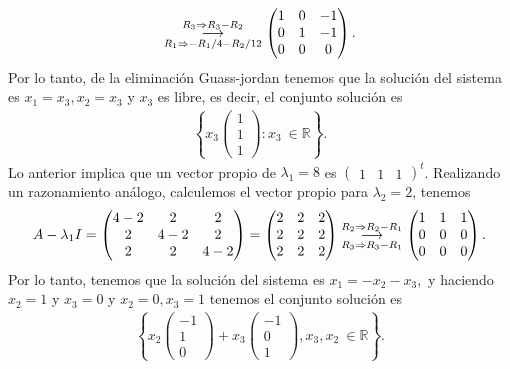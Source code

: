 \documentclass[11pt,letterpaper]{article}
\newcommand{\mR}{\mathbb{R}}
\newcommand{\grstep}[2][\relax]{%
   \ensuremath{\mathrel{
       {\mathop{\longrightarrow}\limits^{#2\mathstrut}_{
                                     \begin{subarray}{l} #1 \end{subarray}}}}}}
\begin{document}
\begin{enumerate}
\begin{align*}
%
\grstep[R_1\Rightarrow -R_1/4-R_2/12]{R_3 \Rightarrow R_3-R_2}
%
\begin{pmatrix}
1 & 0 & -1\\
0 & 1 & -1\\
0 & 0 & 0
\end{pmatrix}.
\end{align*}
Por lo tanto, de la eliminación Guass-jordan tenemos que la solución del sistema es $x_1=x_3, x_2=x_3$ y $x_3$ es libre, es decir, el conjunto solución es
\begin{align*}
\left\{x_3\begin{pmatrix}
 1\\
 1\\
 1
\end{pmatrix}: x_3 \ \in \mR \right\}.
\end{align*}
Lo anterior implica que un vector propio de $\lambda_1=8$ es 
$\begin{pmatrix}
1 & 1 & 1
\end{pmatrix}^t$. Realizando un razonamiento análogo, calculemos el vector propio para $\lambda_2=2$, tenemos 
\begin{align*}
A-\lambda_1I=\begin{pmatrix}
4-2 & 2 & 2\\
2 & 4-2 & 2\\
2 & 2 & 4-2
\end{pmatrix}=\begin{pmatrix}
2 & 2 & 2\\
2 & 2 & 2\\
2 & 2 & 2
\end{pmatrix}%
\grstep[R_3\Rightarrow R_3-R_1]{R_2 \Rightarrow R_2-R_1}
%
\begin{pmatrix}
1 & 1 & 1\\
0 & 0 & 0\\
0 & 0 & 0
\end{pmatrix}.
\end{align*}
Por lo tanto, tenemos que la solución del sistema es $x_1=-x_2-x_3,$ y haciendo $x_2=1$ y $x_3=0$ y $x_2=0,x_3=1$ tenemos el conjunto solución es
\begin{align*}
\left\{x_2\begin{pmatrix}
-1\\
1\\
0
\end{pmatrix}+x_3\begin{pmatrix}
-1\\
0\\
1
\end{pmatrix} , x_3,x_2 \ \in \mR \right\}.

\end{align*}
\end{enumerate}
\end{document}
